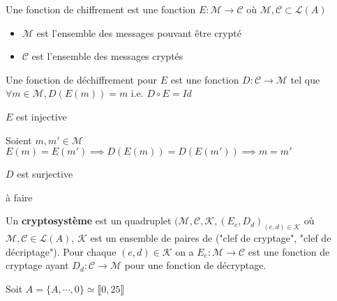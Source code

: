 \documentclass[a4paper, 12pt]{article}
\begin{document}
\begin{definition}
    Une fonction de chiffrement est une fonction $E: \mathscr{M} \rightarrow \mathscr{C}$
    où $\mathscr{M}, \mathscr{C} \subset \mathscr{L}(A)$
    \begin{itemize}
        \item $\mathscr{M}$ est l'ensemble des messages pouvant être crypté
        \item $\mathscr{C}$ est l'ensemble des messages cryptés
    \end{itemize}
\end{definition}

\begin{definition}
    Une fonction de déchiffrement pour $E$ est une fonction $D: \mathscr{C} \rightarrow \mathscr{M}$
    tel que $\forall m \in \mathscr{M}, D(E(m)) = m$ i.e. $D \circ E = Id$
\end{definition}

\begin{proposition}{}{}
    $E$ est injective
\end{proposition}

\begin{demonstration}
    Soient $m, m' \in \mathscr{M}$\n
    $E(m) = E(m') \implies D(E(m)) = D(E(m')) \implies m = m'$
\end{demonstration}

\begin{proposition}{}{}
    $D$ est surjective
\end{proposition}

\begin{demonstration}
    \begin{hotwarn}
        à faire
    \end{hotwarn}
\end{demonstration}

\begin{definition}
    Un \textbf{cryptosystème} est un quadruplet $(\mathscr{M}, \mathscr{C}, \mathscr{K}, (E_e, D_d)_{(e, d) \in \mathscr{K}}$
    où $\mathscr{M}, \mathscr{C} \in \mathscr{L}(A)$,
    $\mathscr{K}$ est un ensemble de paires de ("clef de cryptage", "clef de décriptage").\n
    Pour chaque $(e, d) \in \mathscr{K}$ on a $E_e: \mathscr{M} \rightarrow \mathscr{C}$
    est une fonction de cryptage ayant $D_d: \mathscr{C} \rightarrow \mathscr{M}$ pour une fonction
    de décryptage.
\end{definition}

Soit $A = \{A, \cdots, 0\} \simeq \llbracket 0, 25 \rrbracket$
\end{document}
